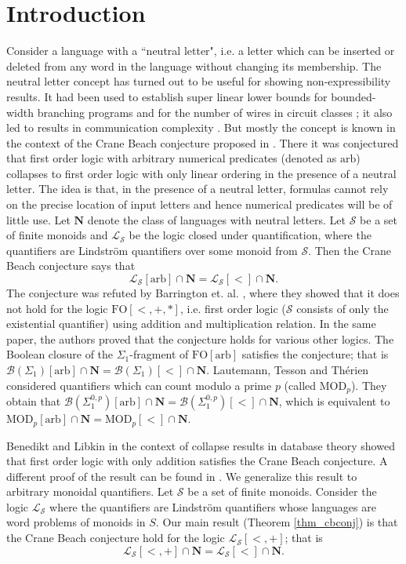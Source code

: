 \documentclass[envcountsame]{llncs}
\newcommand{\FO}{\mathrm{FO}}
\newcommand{\MOD}{\mathrm{MOD}}
\newcommand{\Arb}{\mathrm{arb}}
\newcommand{\NL}{\mathbf{N}}
\begin{document}
\section{Introduction}
Consider a language with a ``neutral letter", i.e. a letter which can be inserted or deleted from any word in the language without 
changing its membership. The neutral letter concept has turned out to be useful for showing non-expressibility results. 
It had been used to establish super linear lower bounds for bounded-width branching
programs \cite{barr_superLinLBBWBP} and for the number of wires in circuit classes \cite{koucky_wiresVsGates}; it also led to results in communication complexity \cite{bddMultiPartyCommCompl}.
But mostly the concept is known in the context of the Crane Beach conjecture  proposed in \cite{barr_cbconj}.
There it was conjectured that first order logic with arbitrary numerical predicates (denoted as $\Arb$)  collapses to 
first order logic with only linear ordering in the presence of a neutral letter. The idea is that, in the presence of a neutral letter, formulas cannot rely on the precise location of input letters and hence numerical predicates will be of little use. Let $\NL$ denote the class of languages with neutral letters. 
Let $\mathcal{S}$ be a set of finite monoids  and $\mathcal{L_S}$ be the logic closed under quantification, where the quantifiers are Lindstr\"om quantifiers over some monoid from $\mathcal{S}$. Then the Crane Beach conjecture says that 
$$\mathcal{L_S}[\Arb] \cap \NL = \mathcal{L_S}[<] \cap \NL.$$
The conjecture was refuted by Barrington et. al. \cite{barr_cbconj}, where they showed that it does not hold for the logic $\FO[<,+,*]$, i.e. 
first order logic ($\mathcal{S}$ consists of only the existential quantifier) using addition and multiplication relation. 
In the same paper, the authors proved that the conjecture holds for various other logics. The Boolean closure of the $\Sigma_1$-fragment of $\FO[\Arb]$ satisfies the conjecture; that is $\mathcal{B}(\Sigma_1)[\Arb] \cap \NL = \mathcal{B}(\Sigma_1)[<] \cap \NL$. 
Lautemann, Tesson and Th\'erien \cite{ltt06} considered quantifiers which can count modulo a prime $p$ (called $\MOD_p$). They obtain that $\mathcal{B}(\Sigma_1^{0,p})[\Arb] \cap \NL = \mathcal{B}(\Sigma_1^{0,p})[<] \cap \NL$, which is equivalent to $\MOD_p[\Arb] \cap \NL = \MOD_p[<] \cap \NL$.

Benedikt and Libkin \cite{libkin_relIntrStruc} in the context of collapse results in database theory showed that first order logic
with only addition satisfies the Crane Beach conjecture. A different proof of the result can be found in \cite{barr_cbconj}. 
We generalize this result to arbitrary monoidal quantifiers. Let $\mathcal{S}$ be a set of finite monoids. Consider the logic
$\mathcal{L_S}$ where the quantifiers are Lindstr\"om quantifiers whose languages are word problems of monoids in $S$. Our main result
(Theorem \ref{thm_cbconj}) is that the Crane Beach conjecture hold for the logic $\mathcal{L_S}[<,+]$; that is
$$\mathcal{L_S}[<,+] \cap \NL = \mathcal{L_S}[<]\cap\NL.$$
\end{document}
